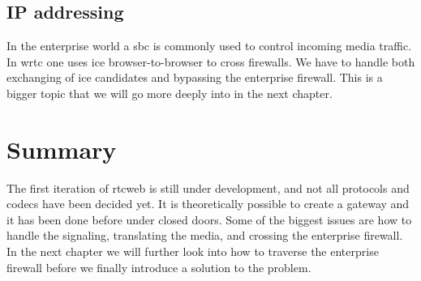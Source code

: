 \subsection{IP addressing}
In the enterprise world a \gls{sbc} is commonly used to control incoming media traffic. In \gls{wrtc} one uses \gls{ice} browser-to-browser to cross firewalls. We have to handle both exchanging of \gls{ice} candidates and bypassing the enterprise firewall. This is a bigger topic that we will go more deeply into in the next chapter.

\section{Summary}
The first iteration of \gls{rtcweb} is still under development, and not all protocols and codecs have been decided yet. It is theoretically possible to create a gateway and it has been done before under closed doors. Some of the biggest issues are how to handle the signaling, translating the media, and crossing the enterprise firewall. In the next chapter we will further look into how to traverse the enterprise firewall before we finally introduce a solution to the problem.
